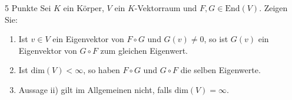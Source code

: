 \documentclass{problemset}
\author{Michael van Straten}
\begin{document}
\maketitle

\begin{problem}{5 Punkte}
Sei $K$ ein Körper, $V$ ein $K$-Vektorraum und $F, G \in \text{End}(V)$. Zeigen Sie:
\begin{enumerate}
    \item Ist $v \in V$ ein Eigenvektor von $F \circ G$ und $G(v) \neq 0$, so
          ist $G(v)$ ein Eigenvektor von $G \circ F$ zum gleichen Eigenwert.
    \item Ist $\text{dim}(V) < \infty$, so haben $F \circ G$ und $G \circ F$
          die selben Eigenwerte.
    \item Aussage ii) gilt im Allgemeinen nicht, falls $\text{dim}(V) =
              \infty$.
\end{enumerate}
\end{problem}
\end{document}

